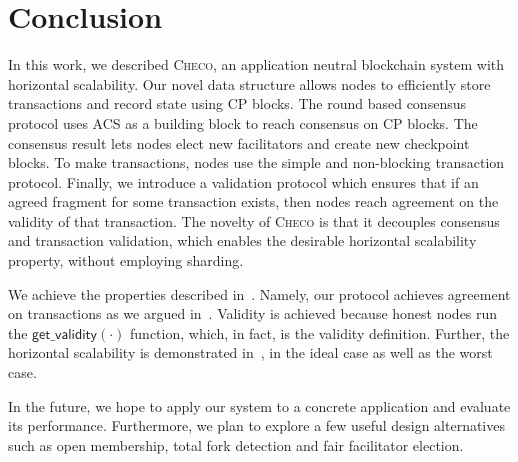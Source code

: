 \section{Conclusion}
\label{sec:conclusion}

In this work, we described \textsc{Checo}, an application neutral blockchain system with horizontal scalability.
Our novel data structure allows nodes to efficiently store transactions and record state using CP blocks.
The round based consensus protocol uses ACS as a building block to reach consensus on CP blocks.
The consensus result lets nodes elect new facilitators and create new checkpoint blocks.
To make transactions, nodes use the simple and non-blocking transaction protocol.
Finally, we introduce a validation protocol which ensures that if an agreed fragment for some transaction exists,
then nodes reach agreement on the validity of that transaction.
The novelty of \textsc{Checo} is that it decouples consensus and transaction validation,
which enables the desirable horizontal scalability property, without employing sharding.

We achieve the properties described in~.
Namely, our protocol achieves agreement on transactions as we argued in~.
Validity is achieved because honest nodes run the $\textsf{get\_validity}(\cdot)$ function, which, in fact, is the validity definition.
Further, the horizontal scalability is demonstrated in~,
in the ideal case as well as the worst case.

In the future, we hope to apply our system to a concrete application and evaluate its performance.
Furthermore, we plan to explore a few useful design alternatives such as open membership, total fork detection and fair facilitator election.

